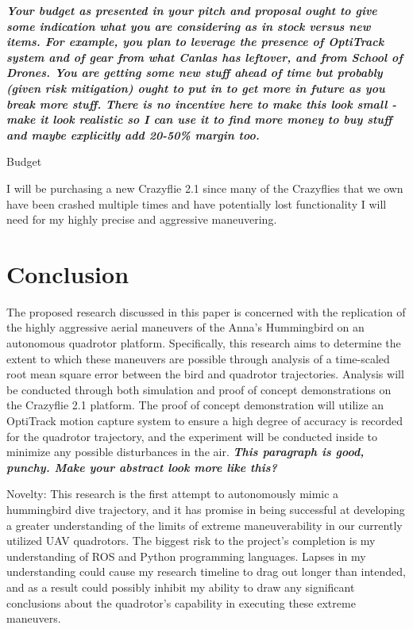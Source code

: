 \documentclass[onecolumn,10pt]{IEEEtran}
\begin{document}
\emph{\textbf{Your budget as presented in your pitch and proposal ought to give some indication what you are considering as in stock versus new items. For example, you plan to leverage the presence of OptiTrack system and of gear from what Canlas has leftover, and from School of Drones. You are getting some new stuff ahead of time but probably (given risk mitigation) ought to put in to get more in future as you break more stuff. There is no incentive here to make this look small - make it look realistic so I can use it to find more money to buy stuff and maybe explicitly add 20-50\% margin too. }}

\begin{table}[hb]
\caption{Budget}
\label{table-budget}
\end{table}

I will be purchasing a new Crazyflie 2.1 since many of the Crazyflies that we own have been crashed multiple times and have potentially lost functionality I will need for my highly precise and aggressive maneuvering.




\section{Conclusion}
The proposed research discussed in this paper is concerned with the replication of the highly aggressive aerial maneuvers of the Anna’s Hummingbird on an autonomous quadrotor platform. Specifically, this research aims to determine the extent to which these maneuvers are possible through analysis of a time-scaled root mean square error between the bird and quadrotor trajectories. Analysis will be conducted through both simulation and proof of concept demonstrations on the Crazyflie 2.1 platform. The proof of concept demonstration will utilize an OptiTrack motion capture system to ensure a high degree of accuracy is recorded for the quadrotor trajectory, and the experiment will be conducted inside to minimize any possible disturbances in the air. \emph{\textbf{This paragraph is good, punchy. Make your abstract look more like this?}}

Novelty: This research is the first attempt to autonomously mimic a hummingbird dive trajectory, and it has promise in being successful at developing a greater understanding of the limits of extreme maneuverability in our currently utilized UAV quadrotors. The biggest risk to the project’s completion is my understanding of ROS and Python programming languages. Lapses in my understanding could cause my research timeline to drag out longer than intended, and as a result could possibly inhibit my ability to draw any significant conclusions about the quadrotor’s capability in executing these extreme maneuvers.
\end{document}
